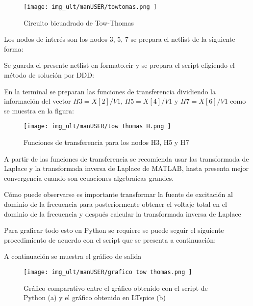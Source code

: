\begin{figure}[H]
	\centering\texttt{[image: img\_ult/manUSER/towtomas.png
	]}
	\caption{Circuito bicuadrado de Tow-Thomas}
	\label{img:Tow thomas}
\end{figure} 

Los nodos de interés son los nodos 3, 5, 7 se prepara el netlist de la siguiente forma:


Se guarda el presente netlist en formato.cir y se prepara el script eligiendo el método de solución por DDD:


En la terminal se preparan las funciones de transferencia dividiendo la información del vector $H3=X[2]/V1$, $H5=X[4]/V1$ y $H7=X[6]/V1$ como se muestra en la figura:

\begin{figure}[H]
	\centering\texttt{[image: img\_ult/manUSER/tow thomas H.png
	]}
	\caption{Funciones de transferencia para los nodos H3, H5 y H7}
	\label{img:Tow thomas H}
\end{figure} 

A partir de las funciones de transferencia se recomienda usar las transformada de Laplace y la transformada inversa de Laplace de MATLAB, hasta presenta mejor convergencia cuando son ecuaciones algebraicas grandes.



Cómo puede observarse es importante transformar la fuente de excitación al dominio de la frecuencia para posteriormente obtener el voltaje total en el dominio de la frecuencia y después calcular la transformada inversa de Laplace 

Para graficar todo esto en Python se requiere se puede seguir el siguiente procedimiento de acuerdo con el script que se presenta a continuación:



A continuación se muestra el gráfico de salida 

\begin{figure}[H]
	\centering\texttt{[image: img\_ult/manUSER/grafico tow thomas.png
	]}
	\caption{Gráfico comparativo entre el gráfico obtenido con el script de Python (a) y el gráfico obtenido en LTspice (b)}
	\label{img:Tow thomas grafico}
\end{figure} 


